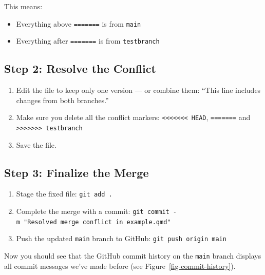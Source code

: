 \documentclass[
  11pt,
  letterpaper,
  DIV=11,
  numbers=noendperiod]{scrartcl}
\providecommand{\tightlist}{%
  \setlength{\itemsep}{0pt}\setlength{\parskip}{0pt}}\usepackage{longtable,booktabs,array}
\let\textttOrig\texttt
\renewcommand{\texttt}[1]{\textttOrig{\colorbox{codebggray}{\textcolor{codefontcolor}{#1}}}}
\begin{document}
This means:

\begin{itemize}
\item
  Everything above \texttt{=======} is from \texttt{main}
\item
  Everything after \texttt{=======} is from \texttt{testbranch}
\end{itemize}

\subsection{Step 2: Resolve the
Conflict}\label{step-2-resolve-the-conflict}

\begin{enumerate}
\def\labelenumi{\arabic{enumi}.}
\tightlist
\item
  Edit the file to keep only one version --- or combine them: ``This
  line includes changes from both branches.''
\item
  Make sure you delete all the conflict markers:
  \texttt{\textless{}\textless{}\textless{}\textless{}\textless{}\textless{}\textless{}\ HEAD},
  \texttt{=======} and
  \texttt{\textgreater{}\textgreater{}\textgreater{}\textgreater{}\textgreater{}\textgreater{}\textgreater{}\ testbranch}
\item
  Save the file.
\end{enumerate}

\subsection{Step 3: Finalize the Merge}\label{step-3-finalize-the-merge}

\begin{enumerate}
\def\labelenumi{\arabic{enumi}.}
\tightlist
\item
  Stage the fixed file: \texttt{git\ add\ .}
\item
  Complete the merge with a commit:
  \texttt{git\ commit\ -m\ "Resolved\ merge\ conflict\ in\ example.qmd"}
\item
  Push the updated \texttt{main} branch to GitHub:
  \texttt{git\ push\ origin\ main}
\end{enumerate}

Now you should see that the GitHub commit history on the \texttt{main}
branch displays all commit messages we've made before (see
Figure~\ref{fig-commit-history}).
\end{document}
